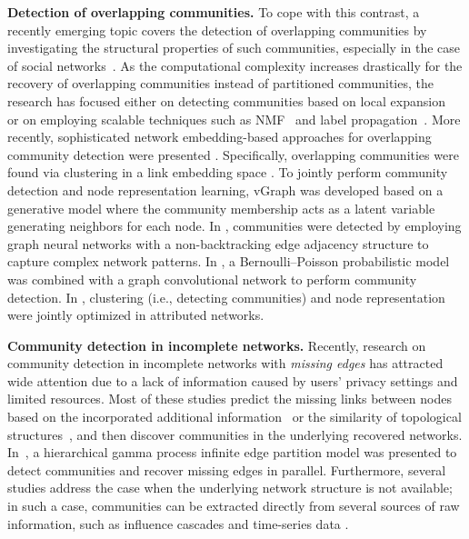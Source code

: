 \documentclass[format=acmsmall, review=false, screen=true]{acmart}
\begin{document}
{\bf Detection of overlapping communities.} To cope with this contrast, a recently emerging topic covers the detection of overlapping communities by investigating the structural properties of such communities, especially in the case of social networks~\cite{agm,papadopoulos2012community}. As the computational complexity increases drastically for the recovery of overlapping communities instead of partitioned communities, the research has focused either on detecting communities based on local expansion~\cite{whang2016overlapping,tkdd2} or on employing scalable techniques such as NMF~\cite{bigclam,BNMF,newnmf} and label propagation~\cite{COPRA,SLPA}. More recently, sophisticated network embedding-based approaches for overlapping community detection were presented \cite{linkblack,linkembedding,vgraph,gnn1,gnn2,TKDDgnn}. Specifically, overlapping communities were found via clustering in a link embedding space \cite{linkblack,linkembedding}. To jointly perform community detection and node representation learning, vGraph \cite{vgraph} was developed based on  a generative model where the community membership acts as a latent variable generating neighbors for each node. In \cite{gnn1}, communities were detected by employing graph neural networks with a non-backtracking edge adjacency structure to capture complex network patterns. In \cite{gnn2}, a Bernoulli--Poisson probabilistic model was combined with a graph convolutional network to perform community detection. In \cite{TKDDgnn},  clustering (i.e., detecting communities) and node representation were jointly optimized in attributed networks.


{\bf Community detection in incomplete networks.} Recently, research on community detection in incomplete networks with {\em missing edges} has attracted wide attention due to a lack of information caused by users' privacy settings and limited resources. Most of these studies predict the missing links between nodes based on the incorporated additional information~\cite{yang2013community} or the similarity of topological structures~\cite{yan2011finding,yan2012detecting}, and then discover communities in the underlying recovered networks. In~\cite{zhou2015infinite}, a hierarchical gamma process infinite edge partition model was presented to detect communities and recover missing edges in parallel. Furthermore, several studies address the case when the underlying network structure is not available; in such a case, communities can be extracted directly from several sources of raw information, such as influence cascades  \cite{comcascades}  and time-series  data \cite{comtimedata}.
\end{document}
